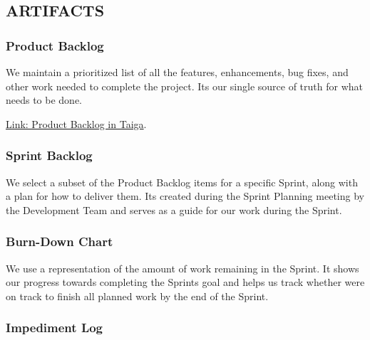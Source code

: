\newpage

\hypertarget{artifacts}{
\subsection{ARTIFACTS}\label{artifacts}}

\hypertarget{productbacklog}{
\subsubsection{\texorpdfstring{\textbf{Product
Backlog}}{Product Backlog}}\label{productbacklog}}

We maintain a prioritized list of all the features, enhancements, bug
fixes, and other work needed to complete the project.
It\textquotesingle s our single source of truth for what needs to be
done.

\href{https://tree.taiga.io/project/joseluis-teran-coffeetime/backlog}{Link: Product Backlog in Taiga}.

\hypertarget{sprintbacklog}{
\subsubsection{\texorpdfstring{\textbf{Sprint
Backlog}}{Sprint Backlog}}\label{sprintbacklog}}

We select a subset of the Product Backlog items for a specific Sprint,
along with a plan for how to deliver them. It\textquotesingle s created
during the Sprint Planning meeting by the Development Team and serves as
a guide for our work during the Sprint.

\hypertarget{burndownchart}{
\subsubsection{\texorpdfstring{\textbf{Burn-Down
Chart}}{Burn-Down Chart}}\label{burndownchart}}

We use a representation of the amount of work remaining in the Sprint.
It shows our progress towards completing the Sprint\textquotesingle s
goal and helps us track whether we\textquotesingle re on track to finish
all planned work by the end of the Sprint.

\hypertarget{impedimentlog}{
\subsubsection{\texorpdfstring{\textbf{Impediment
Log}}{Impediment Log}}\label{impedimentlog}}

